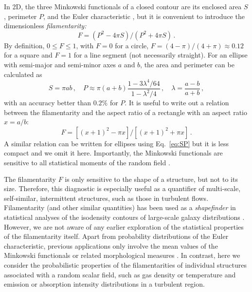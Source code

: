 \documentclass[useAMS,usenatbib]{mn2e}
\begin{document}
In 2D, the three Minkowski functionals of a closed contour are its enclosed
area $S$, perimeter $P$, and the Euler characteristic \citep{AT07}, but it is
convenient to introduce the dimensionless \textit{filamentarity:\/}
\begin{equation}
F = (P^2 - 4 \pi S)/(P^2 + 4 \pi S)\,.
\label{eq:F}
\end{equation}
By definition, $0 \leq F \leq 1$, with $F = 0$ for a circle, $F = (4 - \pi)/(4
+ \pi) \approx 0.12$ for a square and $F = 1$ for a line segment (not
necessarily straight). For an ellipse with semi-major and semi-minor axes $a$
and $b$, the area and perimeter can be calculated as
\begin{equation}\label{eq:SP}
S = \pi a b\,,
\quad P \approx \pi (a + b) \frac{1 - 3 \lambda^4/64}{1 - \lambda^2/4}\,,
\quad \lambda=\frac{a-b}{a+b}\,,
\end{equation}
with an accuracy better than $0.2\%$ for $P$. It is useful to write out a
relation between the filamentarity and the aspect ratio of a rectangle with an
aspect ratio $x=a/b$:
\begin{equation}\label{Fx}
F=[(x+1)^2-\pi x]/[(x+1)^2+\pi x]\,.
\end{equation}
A similar relation can be written for ellipses using Eq.~\eqref{eq:SP} but it
is less compact and we omit it here. Importantly, the Minkowski functionals
are sensitive to all statistical moments of the random field
\citep[e.g.,][]{WBO14}.

The filamentarity $F$ is only sensitive to the shape of a structure, but not
to its size. Therefore, this diagnostic is especially useful as a quantifier
of multi-scale, self-similar, intermittent structures, such as those in
turbulent flows. Filamentarity (and other similar quantities) has been used as
a \textit{shapefinder\/} in statistical analyses of the isodensity contours of
large-scale galaxy distributions \citep{Mecke94,Sahni98,SBMSSS99}. However, we
are not aware of any earlier exploration of the statistical properties of the
filamentarity itself. Apart from probability distributions of the Euler
characteristic, previous applications only involve the mean values of the
Minkowski functionals or related morphological measures
\citep{PB96,SW08,WBO14}. In contrast, here we consider the probabilistic
properties of the filamentarities of individual structures associated with a
random scalar field, such as gas density or temperature and emission or
absorption intensity distributions in a turbulent region.

\end{document}
